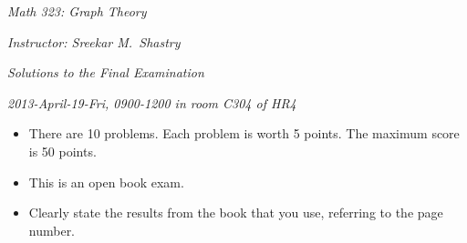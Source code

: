 \documentclass[10pt,reqno]{amsart}
\begin{document}
\noindent \textit{Math 323: Graph Theory}

\noindent \textit{Instructor: Sreekar M.~Shastry}

\noindent \textit{Solutions to the Final Examination}

\noindent \textit{2013-April-19-Fri, 0900-1200 in room C304 of HR4}

\medskip

\begin{itemize}
    \item There are 10 problems. Each problem is worth 5 points. The
        maximum score is 50 points.
    \item This is an open book exam.
    \item Clearly state the results from the book that you use, referring to
      the page number.
\end{itemize}

\medskip
\end{document}
